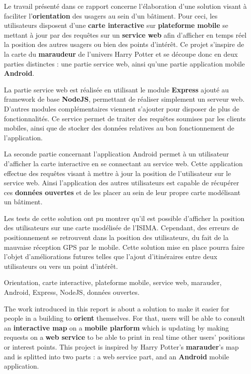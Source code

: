 

Le travail présenté dans ce rapport concerne l'élaboration d'une solution visant à faciliter l’\textbf{orientation} des usagers au sein d'un bâtiment. Pour ceci, les utilisateurs disposent d'une \textbf{carte interactive} sur \textbf{plateforme mobile} se mettant à jour par des requêtes sur un \textbf{service web} afin d’afficher en temps réel la position des autres usagers ou bien des points d’intérêt. Ce projet s’inspire de la carte du \textbf{maraudeur} de l’univers Harry Potter et se découpe donc en deux parties distinctes : une partie service web, ainsi qu'une partie application mobile \textbf{Android}.

La partie service web est réalisée en utilisant le module \textbf{Express} ajouté au framework de base \textbf{NodeJS}, permettant de réaliser simplement un serveur web. D'autres modules complémentaires viennent s'ajouter pour disposer de plus de fonctionnalités. Ce service permet de traiter des requêtes soumises par les clients mobiles, ainsi que de stocker des données relatives au bon fonctionnement de l'application.

La seconde partie concernant l'application Android permet à un utilisateur d’afficher la carte interactive en se connectant au service web. Cette application effectue des requêtes visant à mettre à jour la position de l'utilisateur sur le service web. Ainsi l’application des autres utilisateurs est capable de récupérer ces \textbf{données ouvertes} et de les placer au sein de leur propre carte modélisant un bâtiment.

Les tests de cette solution ont pu montrer qu'il est possible d'afficher la position des utilisateurs sur une carte modélisée de l'ISIMA. Cependant, des erreurs de positionnement se retrouvent dans la position des utilisateurs, du fait de la mauvaise réception GPS par le mobile. Cette solution mise en place pourra faire l'objet d'améliorations futures telles que l'ajout d'itinéraires entre deux utilisateurs ou vers un point d'intérêt.

Orientation, carte interactive, plateforme mobile, service web, marauder, Android, Express, NodeJS, données ouvertes.



The work introduced in this report is about a solution to make it easier for people in a building to \textbf{orient} themselves. For that, users will be able to consult an \textbf{interactive map} on a \textbf{mobile plarform} which is updating by making requests on a \textbf{web service} to be able to print in real time other users' positions or interest points. This project is inspired by Harry Potter's \textbf{marauder}'s map and is splitted into two parts : a web service part, and an \textbf{Android} mobile application.

